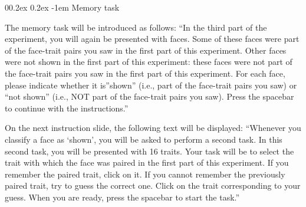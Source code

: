 \documentclass[
  doc,floatsintext]{apa6}
\makeatletter
\let\oldparagraph\paragraph
\renewcommand{\paragraph}[1]{\oldparagraph{#1}\mbox{}}
\renewcommand{\paragraph}{\@startsection{paragraph}{4}{\parindent}%
  {0\baselineskip \@plus 0.2ex \@minus 0.2ex}%
  {-1em}%
  {\normalfont\normalsize\bfseries\itshape\typesectitle}}
\makeatother
\begin{document}
\hypertarget{memory-task}{%
\paragraph{Memory task}\label{memory-task}}

The memory task will be introduced as follows:
``In the third part of the experiment, you will again be presented with faces.
Some of these faces were part of the face-trait pairs you saw in the first part of this experiment.
Other faces were not shown in the first part of this experiment: these faces were not part of the face-trait pairs you saw in the first part of this experiment.
For each face, please indicate whether it is''shown'' (i.e., part of the face-trait pairs you saw) or
``not shown'' (i.e., NOT part of the face-trait pairs you saw).
Press the spacebar to continue with the instructions.''

On the next instruction slide, the following text will be displayed:
``Whenever you classify a face as `shown', you will be asked to perform a second task.
In this second task, you will be presented with 16 traits.
Your task will be to select the trait with which the face was paired in the first part of this experiment.
If you remember the paired trait, click on it.
If you cannot remember the previously paired trait, try to guess the correct one.
Click on the trait corresponding to your guess.
When you are ready, press the spacebar to start the task.''
\end{document}
